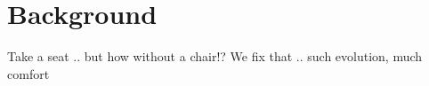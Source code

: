 \section{Background}
Take a seat .. but how without a chair!?
We fix that .. such evolution, much comfort
